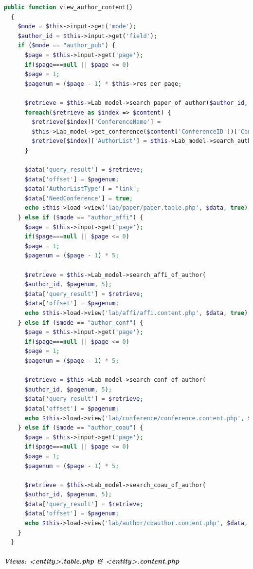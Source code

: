\documentclass[a4paper, 10pt]{article}
\begin{document}
\begin{lstlisting}[language=php]
  public function view_author_content()
  {
    $mode = $this->input->get('mode');
    $author_id = $this->input->get('field');
    if ($mode == "author_pub") {
      $page = $this->input->get('page');
      if($page===null || $page <= 0)
      $page = 1;
      $pagenum = ($page - 1) * $this->res_per_page;
      
      $retrieve = $this->Lab_model->search_paper_of_author($author_id, $pagenum, $this->res_per_page);
      foreach($retrieve as $index => $content) {
        $retrieve[$index]['ConferenceName'] = 
        $this->Lab_model->get_conference($content['ConferenceID'])['ConferenceName'];
        $retrieve[$index]['AuthorList'] = $this->Lab_model->search_author_of_paper($content['PaperID']);
      }
      
      $data['query_result'] = $retrieve;
      $data['offset'] = $pagenum;
      $data['AuthorListType'] = "link";
      $data['NeedConference'] = true;
      echo $this->load->view('lab/paper/paper.table.php', $data, true);
    } else if ($mode == "author_affi") {
      $page = $this->input->get('page');
      if($page===null || $page <= 0)
      $page = 1;
      $pagenum = ($page - 1) * 5;
      
      $retrieve = $this->Lab_model->search_affi_of_author(
      $author_id, $pagenum, 5);
      $data['query_result'] = $retrieve;
      $data['offset'] = $pagenum;
      echo $this->load->view('lab/affi/affi.content.php', $data, true);
    } else if ($mode == "author_conf") {
      $page = $this->input->get('page');
      if($page===null || $page <= 0)
      $page = 1;
      $pagenum = ($page - 1) * 5;
      
      $retrieve = $this->Lab_model->search_conf_of_author(
      $author_id, $pagenum, 5);
      $data['query_result'] = $retrieve;
      $data['offset'] = $pagenum;
      echo $this->load->view('lab/conference/conference.content.php', $data, true);
    } else if ($mode == "author_coau") {
      $page = $this->input->get('page');
      if($page===null || $page <= 0)
      $page = 1;
      $pagenum = ($page - 1) * 5;
      
      $retrieve = $this->Lab_model->search_coau_of_author(
      $author_id, $pagenum, 5);
      $data['query_result'] = $retrieve;
      $data['offset'] = $pagenum;
      echo $this->load->view('lab/author/coauthor.content.php', $data, true);
    }
  }
\end{lstlisting}

\subparagraph{Views: <entity>.table.php \& <entity>.content.php}\ \\
\end{document}
